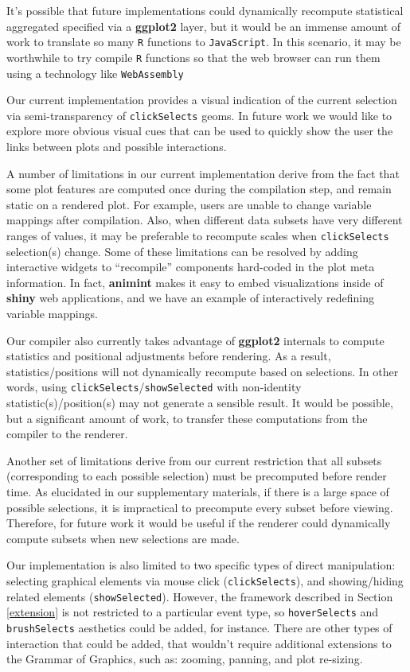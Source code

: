 \documentclass[12pt,]{article}
\theoremstyle{definition}
\theoremstyle{definition}
\theoremstyle{definition}
\theoremstyle{remark}
\begin{document}
It's possible that future implementations could dynamically recompute
statistical aggregated specified via a \textbf{ggplot2} layer, but it
would be an immense amount of work to translate so many \texttt{R}
functions to \texttt{JavaScript}. In this scenario, it may be worthwhile
to try compile \texttt{R} functions so that the web browser can run them
using a technology like \texttt{WebAssembly}

Our current implementation provides a visual indication of the current
selection via semi-transparency of \texttt{clickSelects} geoms. In
future work we would like to explore more obvious visual cues that can
be used to quickly show the user the links between plots and possible
interactions.

A number of limitations in our current implementation derive from the
fact that some plot features are computed once during the compilation
step, and remain static on a rendered plot. For example, users are
unable to change variable mappings after compilation. Also, when
different data subsets have very different ranges of values, it may be
preferable to recompute scales when \texttt{clickSelects} selection(s)
change. Some of these limitations can be resolved by adding interactive
widgets to ``recompile'' components hard-coded in the plot meta
information. In fact, \textbf{animint} makes it easy to embed
visualizations inside of \textbf{shiny} web applications, and we have an
example of interactively redefining variable mappings.

Our compiler also currently takes advantage of \textbf{ggplot2}
internals to compute statistics and positional adjustments before
rendering. As a result, statistics/positions will not dynamically
recompute based on selections. In other words, using
\texttt{clickSelects}/\texttt{showSelected} with non-identity
statistic(s)/position(s) may not generate a sensible result. It would be
possible, but a significant amount of work, to transfer these
computations from the compiler to the renderer.

Another set of limitations derive from our current restriction that all
subsets (corresponding to each possible selection) must be precomputed
before render time. As elucidated in our supplementary materials, if
there is a large space of possible selections, it is impractical to
precompute every subset before viewing. Therefore, for future work it
would be useful if the renderer could dynamically compute subsets when
new selections are made.

Our implementation is also limited to two specific types of direct
manipulation: selecting graphical elements via mouse click
(\texttt{clickSelects}), and showing/hiding related elements
(\texttt{showSelected}). However, the framework described in Section
\ref{extension} is not restricted to a particular event type, so
\texttt{hoverSelects} and \texttt{brushSelects} aesthetics could be
added, for instance. There are other types of interaction that could be
added, that wouldn't require additional extensions to the Grammar of
Graphics, such as: zooming, panning, and plot re-sizing.
\end{document}
